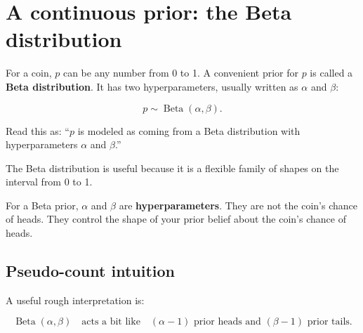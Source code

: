 \documentclass[11pt]{article}
\begin{document}
\section{A continuous prior: the Beta distribution}

For a coin, $p$ can be any number from 0 to 1. A convenient prior for $p$ is called a \textbf{Beta distribution}. It has two hyperparameters, usually written as $\alpha$ and $\beta$:

\[
p \sim \operatorname{Beta}(\alpha,\beta).
\]

Read this as: ``$p$ is modeled as coming from a Beta distribution with hyperparameters $\alpha$ and $\beta$.''

The Beta distribution is useful because it is a flexible family of shapes on the interval from 0 to 1.

\begin{center}
\end{center}

\begin{bigidea}
For a Beta prior, $\alpha$ and $\beta$ are \textbf{hyperparameters}. They are not the coin's chance of heads. They control the shape of your prior belief about the coin's chance of heads.
\end{bigidea}

\subsection*{Pseudo-count intuition}

A useful rough interpretation is:

\begin{equation}
\operatorname{Beta}(\alpha,\beta) \quad \text{acts a bit like} \quad (\alpha-1) \text{ prior heads and } (\beta-1) \text{ prior tails.}
\end{equation}
\end{document}
